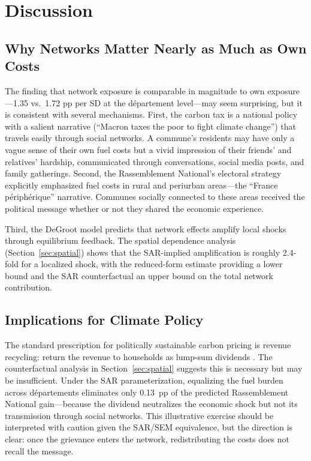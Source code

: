 \documentclass[12pt]{article}
\newcommand{\rn}{Rassemblement National}
\newcommand{\dept}{d\'{e}partement}
\newcommand{\depts}{d\'{e}partements}
\begin{document}

\section{Discussion}
\label{sec:discussion}

\subsection{Why Networks Matter Nearly as Much as Own Costs}

The finding that network exposure is comparable in magnitude to own exposure---1.35 vs.\ 1.72 pp per SD at the \dept{} level---may seem surprising, but it is consistent with several mechanisms. First, the carbon tax is a national policy with a salient narrative (``Macron taxes the poor to fight climate change'') that travels easily through social networks. A commune's residents may have only a vague sense of their own fuel costs but a vivid impression of their friends' and relatives' hardship, communicated through conversations, social media posts, and family gatherings. Second, the \rn{}'s electoral strategy explicitly emphasized fuel costs in rural and periurban areas---the ``France p\'{e}riph\'{e}rique'' narrative. Communes socially connected to these areas received the political message whether or not they shared the economic experience.

Third, the DeGroot model predicts that network effects amplify local shocks through equilibrium feedback. The spatial dependence analysis (Section~\ref{sec:spatial}) shows that the SAR-implied amplification is roughly 2.4-fold for a localized shock, with the reduced-form estimate providing a lower bound and the SAR counterfactual an upper bound on the total network contribution.

\subsection{Implications for Climate Policy}

The standard prescription for politically sustainable carbon pricing is revenue recycling: return the revenue to households as lump-sum dividends \citep{klenert2018carbon, stiglitz2019addressing}. The counterfactual analysis in Section~\ref{sec:spatial} suggests this is necessary but may be insufficient. Under the SAR parameterization, equalizing the fuel burden across \depts{} eliminates only 0.13~pp of the predicted \rn{} gain---because the dividend neutralizes the economic shock but not its transmission through social networks. This illustrative exercise should be interpreted with caution given the SAR/SEM equivalence, but the direction is clear: once the grievance enters the network, redistributing the costs does not recall the message.
\end{document}
